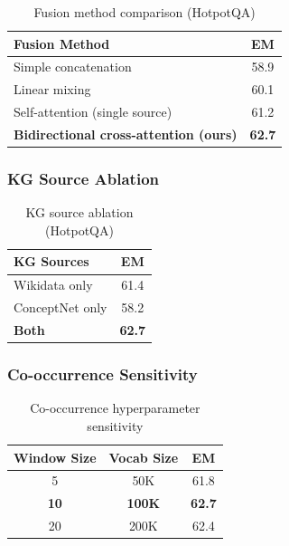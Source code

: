 \documentclass[10pt,twocolumn]{article}
\begin{document}
\begin{table}[h]
\centering
\caption{Fusion method comparison (HotpotQA)}
\label{tab:fusion_ablation}
\small
\begin{tabular}{@{}lc@{}}
\toprule
\textbf{Fusion Method} & \textbf{EM} \\
\midrule
Simple concatenation & 58.9 \\
Linear mixing & 60.1 \\
Self-attention (single source) & 61.2 \\
\textbf{Bidirectional cross-attention (ours)} & \textbf{62.7} \\
\bottomrule
\end{tabular}
\end{table}

\subsubsection{KG Source Ablation}
\label{sec:kg_source_ablation}

\begin{table}[h]
\centering
\caption{KG source ablation (HotpotQA)}
\label{tab:kg_source}
\small
\begin{tabular}{@{}lc@{}}
\toprule
\textbf{KG Sources} & \textbf{EM} \\
\midrule
Wikidata only & 61.4 \\
ConceptNet only & 58.2 \\
\textbf{Both} & \textbf{62.7} \\
\bottomrule
\end{tabular}
\end{table}

\subsubsection{Co-occurrence Sensitivity}
\label{sec:cooc_sensitivity}

\begin{table}[h]
\centering
\caption{Co-occurrence hyperparameter sensitivity}
\label{tab:cooc_sensitivity}
\small
\begin{tabular}{@{}ccc@{}}
\toprule
\textbf{Window Size} & \textbf{Vocab Size} & \textbf{EM} \\
\midrule
5 & 50K & 61.8 \\
\textbf{10} & \textbf{100K} & \textbf{62.7} \\
20 & 200K & 62.4 \\
\bottomrule
\end{tabular}
\end{table}
\end{document}
